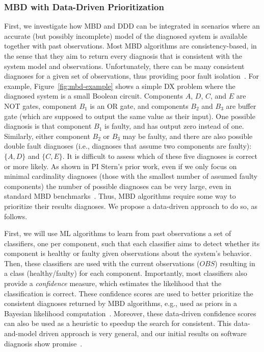 \documentclass[12pt]{article}
\begin{document}
\subsubsection{MBD with Data-Driven Prioritization} 
First, we investigate how MBD and DDD can be integrated in scenarios where an accurate (but possibly incomplete) model of the diagnosed system is available together with past observations. 
Most MBD algorithms are consistency-based, in the sense that they aim to return every diagnosis  that is consistent with the system model and observations. 
Unfortunately, there can be many consistent diagnoses for a given set of observations, thus providing poor fault isolation~\cite{stern2015many}. 
For example, Figure~\ref{fig:mbd-example} shows a simple DX problem where the diagnosed system is a small Boolean circuit. Components $A$, $D$, $C$, and $E$ are NOT gates, component $B_1$ is an OR gate, and components $B_2$ and $B_3$ are buffer gate (which are supposed to output the same value as their input). One possible diagnosis is that component $B_1$ is faulty, and has output zero instead of one. Similarly, either component $B_2$ or $B_3$ may be faulty, 
and there are also possible double fault diagnoses (i.e., diagnoses that assume two components are faulty): $\{ A,D \}$ and $\{C,E\}$. It is difficult to assess which of these five diagnoses is correct or more likely. 
As shown in PI Stern's prior work, even if we only focus on minimal cardinality diagnoses (those with the smallest number of assumed faulty components) the number of possible diagnoses can be very large, even in standard MBD benchmarks~\cite{stern2015many}. Thus, MBD algorithms require some way to prioritize their results diagnoses. We propose a data-driven approach to do so, as follows. 


First, we will use ML algorithms to learn from past observations a set of classifiers, one per component, such that each classifier aims to detect whether its component is healthy or faulty given observations about the system's behavior. 
Then, these classifiers are used with the current observations ($OBS$) resulting in a class (healthy/faulty) for each component. Importantly, most classifiers also provide a {\em confidence} measure, which estimates the likelihood that the classification is correct. These confidence scores are used 
to better prioritize the consistent diagnoses returned by MBD algorithms, e.g., used as priors in a Bayesian likelihood computation~\cite{abreu2009new}. Moreover, these data-driven confidence scores can also be used as a heuristic to speedup the search for consistent. This data-and-model driven approach is very general, and our initial results on software  diagnosis show promise~\cite{elmishali2016dataAugmented}. 
\end{document}
